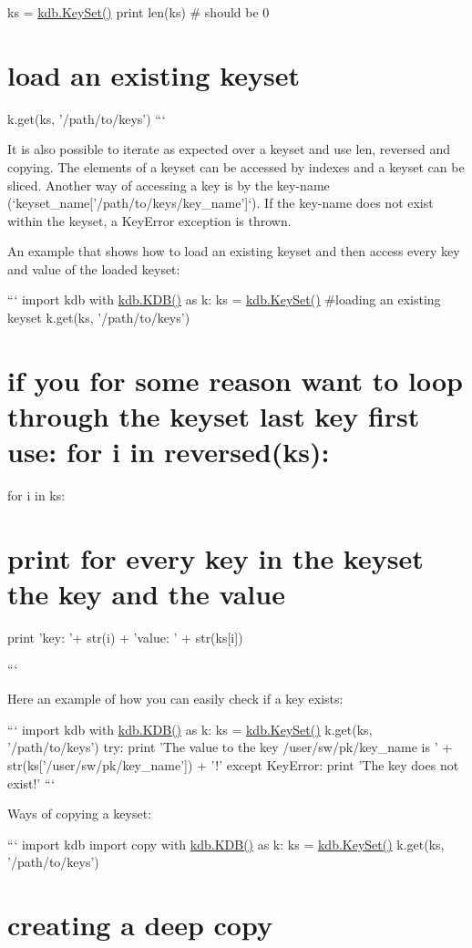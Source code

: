 ks = \hyperlink{classkdb_1_1KeySet}{kdb.\+Key\+Set()} print len(ks) \# should be 0 \section*{load an existing keyset}

k.\+get(ks, '/path/to/keys') ```

It is also possible to iterate as expected over a keyset and use len, reversed and copying. The elements of a keyset can be accessed by indexes and a keyset can be sliced. Another way of accessing a key is by the key-\/name (`keyset\+\_\+name\mbox{[}'/path/to/keys/key\+\_\+name'\mbox{]}`). If the key-\/name does not exist within the keyset, a Key\+Error exception is thrown.

An example that shows how to load an existing keyset and then access every key and value of the loaded keyset\+:

``` import kdb with \hyperlink{classkdb_1_1KDB}{kdb.\+K\+D\+B()} as k\+: ks = \hyperlink{classkdb_1_1KeySet}{kdb.\+Key\+Set()} \#loading an existing keyset k.\+get(ks, '/path/to/keys') \section*{if you for some reason want to loop through the keyset last key first use\+: for i in reversed(ks)\+:}

for i in ks\+: \section*{print for every key in the keyset the key and the value}

print 'key\+: '+ str(i) + 'value\+: ' + str(ks\mbox{[}i\mbox{]})

```

Here an example of how you can easily check if a key exists\+:

``` import kdb with \hyperlink{classkdb_1_1KDB}{kdb.\+K\+D\+B()} as k\+: ks = \hyperlink{classkdb_1_1KeySet}{kdb.\+Key\+Set()} k.\+get(ks, '/path/to/keys') try\+: print 'The value to the key /user/sw/pk/key\+\_\+name is ' + str(ks\mbox{[}'/user/sw/pk/key\+\_\+name'\mbox{]}) + '!' except Key\+Error\+: print 'The key does not exist!' ```

Ways of copying a keyset\+:

``` import kdb import copy with \hyperlink{classkdb_1_1KDB}{kdb.\+K\+D\+B()} as k\+: ks = \hyperlink{classkdb_1_1KeySet}{kdb.\+Key\+Set()} k.\+get(ks, '/path/to/keys') \section*{creating a deep copy}

